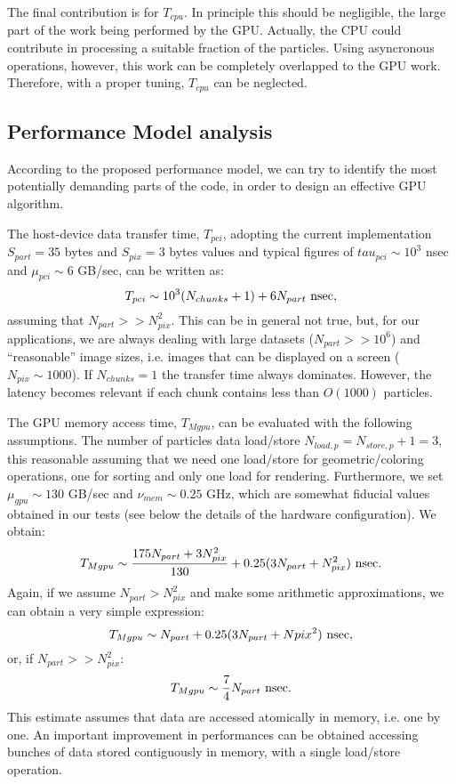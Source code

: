 \documentclass[11pt]{article}
\begin{document}
The final contribution is for $T_{cpu}$. In principle this should be negligible, 
the large part of the work being performed by the GPU. Actually, the CPU
could contribute in processing a suitable fraction of the particles. Using
asyncronous operations, however, this work can be completely overlapped 
to the GPU work. Therefore, with a proper tuning, $T_{cpu}$ can be neglected.

\subsection{Performance Model analysis}

According to the proposed performance model, we can try to identify the most 
potentially demanding parts of the code, in order to design an 
effective GPU algorithm.

The host-device data transfer time, $T_{pci}$, adopting the current implementation 
$S_{part} = 35$ bytes and $S_{pix} = 3$ bytes values and typical figures of 
$tau_{pci} \sim 10^3$ nsec and $\mu_{pci} \sim 6$ GB/sec, can be written as:
\begin{equation}
T_{pci} \sim 10^3(N_{chunks} + 1) + 6 N_{part}\ {\rm nsec},
\end{equation}
assuming that $N_{part} >> N_{pix}^2$. This can be in general not true, but, 
for our applications, we are always dealing with large datasets
($N_{part} >> 10^6$) and ``reasonable'' image sizes, i.e. images that can be 
displayed on a screen ($N_{pix} \sim 1000$). If $N_{chunks} = 1$ the transfer 
time always dominates. However, the latency becomes relevant if each
chunk contains less than $O(1000)$ particles. 

The GPU memory access time, $T_{Mgpu}$, can be evaluated with the 
following assumptions. The number of particles data load/store $N_{load,p} = 
N_{store,p}+1 = 3$, this reasonable assuming that we need one load/store
for geometric/coloring operations, one for sorting and only one load
for rendering. Furthermore, we 
set $\mu_{gpu} \sim 130$ GB/sec and $\nu_{mem} \sim 0.25$ GHz, which are somewhat
fiducial values obtained in our tests (see below the details of the 
hardware configuration). We obtain:
\begin{equation}
T_{Mgpu} \sim {175 N_{part} + 3 N_{pix}^2\over 130} + 0.25 (3 N_{part} + N_{pix}^2)\ {\rm nsec}.
\end{equation}
Again, if we assume $N_{part} > N_{pix}^2$ and make some arithmetic approximations,
we can obtain a very simple expression:
\begin{equation}
T_{Mgpu} \sim N_{part} + 0.25 (3 N_{part} + N{pix}^2)\ {\rm nsec},
\end{equation}
or, if $N_{part} >> N_{pix}^2$:
\begin{equation}
T_{Mgpu} \sim {7\over 4} N_{part}\ {\rm nsec}.
\end{equation}
This estimate assumes that data are accessed atomically in memory, i.e. one by one.
An important improvement in performances can be obtained accessing bunches 
of data stored contiguously in memory, with a single load/store operation.
\end{document}
